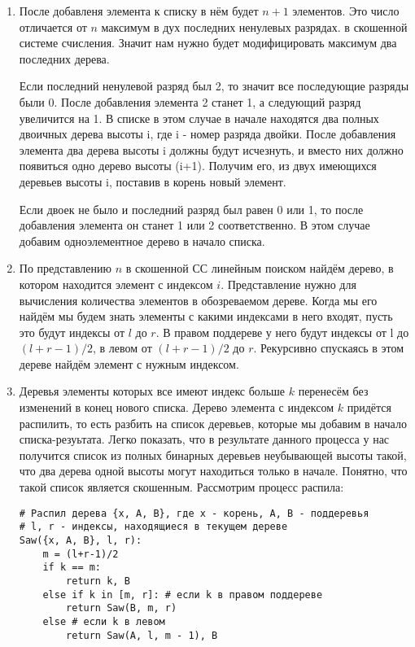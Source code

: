 \documentclass{article}
\begin{document}
\begin{enumerate}[label=(\alph*)]
    \item После добавленя элемента к списку в нём будет $n+1$ элементов. Это
        число отличается от $n$ максимум в дух последних ненулевых разрядах.  в
        скошенной системе счисления. Значит нам нужно будет модифицировать
        максимум два последних дерева.

        Если последний ненулевой разряд был 2, то значит все последующие
        разряды были 0. После добавления элемента 2 станет 1, а следующий
        разряд увеличится на 1. В списке в этом случае в начале находятся два 
        полных двоичных дерева высоты i, где i - номер разряда двойки.
        После добавления элемента два дерева высоты i должны будут исчезнуть, 
        и вместо них должно появиться одно дерево высоты (i+1). Получим его,
        из двух имеющихся деревьев высоты i, поставив в корень новый элемент.

        Если двоек не было и последний разряд был равен 0 или 1, то после
        добавления элемента он станет 1 или 2 соответственно. В этом случае
        добавим одноэлементное дерево в начало списка.

    \item По представлению $n$ в скошенной СС линейным поиском найдём дерево, в
        котором находится элемент с индексом $i$. Представление нужно для
        вычисления количества элементов в обозреваемом дереве. Когда мы его
        найдём мы будем знать элементы с какими индексами в него входят, пусть
        это будут индексы от $l$ до $r$. В правом поддереве у него будут
        индексы от l до $(l+r-1)/2$, в левом от $(l+r-1)/2$ до $r$. Рекурсивно
        спускаясь в этом дереве найдём элемент с нужным индексом.

    \item Деревья элементы которых все имеют индекс больше $k$ перенесём без
        изменений в конец нового списка. Дерево элемента с индексом $k$
        придётся распилить, то есть разбить на список деревьев, которые мы
        добавим в начало списка-резуьтата. Легко показать, что в результате
        данного процесса у нас получится список из полных бинарных деревьев
        неубывающей высоты такой, что два дерева одной высоты могут находиться 
        только в начале. Понятно, что такой список является скошенным.
        Рассмотрим процесс распила:

        \pagebreak

\begin{verbatim}
# Распил дерева {x, A, B}, где x - корень, A, B - поддеревья
# l, r - индексы, находящиеся в текущем дереве
Saw({x, A, B}, l, r):
    m = (l+r-1)/2
    if k == m:
        return k, B
    else if k in [m, r]: # если k в правом поддереве
        return Saw(B, m, r)
    else # если k в левом 
        return Saw(A, l, m - 1), B
\end{verbatim}

\end{enumerate}
\end{document}
